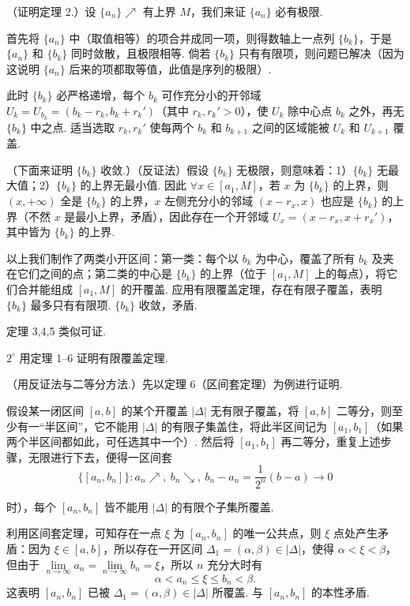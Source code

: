 \documentclass[UTF8,12pt,a4paper,fontset=fandol]{ctexart}
\begin{document}
（证明定理 2.）设 $\{a_n\}\nearrow$ 有上界 $M$，我们来证 $\{a_n\}$ 必有极限.

首先将 $\{a_n\}$ 中（取值相等）的项合并成同一项，则得数轴上一点列 $\{b_k\}$，于是 $\{a_n\}$ 和 $\{b_k\}$ 同时敛散，且极限相等. 倘若 $\{b_k\}$ 只有有限项，则问题已解决（因为这说明 $\{a_n\}$ 后来的项都取等值，此值是序列的极限）.

此时 $\{b_k\}$ 必严格递增，每个 $b_k$ 可作充分小的开邻域 $U_k=U_{b_k}=(b_k-r_k,b_k+r_k')$（其中 $r_k,r_k'>0$），使 $U_k$ 除中心点 $b_k$ 之外，再无 $\{b_k\}$ 中之点. 适当选取 $r_k,r_k'$ 使每两个 $b_k$ 和 $b_{k+1}$ 之间的区域能被 $U_k$ 和 $U_{k+1}$ 覆盖.

（下面来证明 $\{b_k\}$ 收敛.）（反证法）假设 $\{b_k\}$ 无极限，则意味着：1）$\{b_k\}$ 无最大值；2）$\{b_k\}$ 的上界无最小值. 因此 $\forall x\in[a_1,M]$，若 $x$ 为 $\{b_k\}$ 的上界，则 $(x,+\infty)$ 全是 $\{b_k\}$ 的上界，$x$ 左侧充分小的邻域 $(x-r_x,x)$ 也应是 $\{b_k\}$ 的上界（不然 $x$ 是最小上界，矛盾），因此存在一个开邻域 $U_x=(x-r_x,x+r_x')$，其中皆为 $\{b_k\}$ 的上界.

以上我们制作了两类小开区间：第一类：每个以 $b_k$ 为中心，覆盖了所有 $b_k$ 及夹在它们之间的点；第二类的中心是 $\{b_k\}$ 的上界（位于 $[a_1,M]$ 上的每点），将它们合并能组成 $[a_1,M]$ 的开覆盖. 应用有限覆盖定理，存在有限子覆盖，表明 $\{b_k\}$ 最多只有有限项. $\{b_k\}$ 收敛，矛盾.

定理 3,4,5 类似可证.

$2^\circ$ 用定理 1--6 证明有限覆盖定理.

（用反证法与二等分方法.）先以定理 6（区间套定理）为例进行证明.

假设某一闭区间 $[a,b]$ 的某个开覆盖 $|\Delta|$ 无有限子覆盖，将 $[a,b]$ 二等分，则至少有一“半区间”，它不能用 $|\Delta|$ 的有限子集盖住，将此半区间记为 $[a_1,b_1]$（如果两个半区间都如此，可任选其中一个）. 然后将 $[a_1,b_1]$ 再二等分，重复上述步骤，无限进行下去，便得一区间套
\[
  \{[a_n,b_n]\}: a_n\nearrow,\ b_n\searrow,\ b_n-a_n=\frac1{2^n}(b-a)\to0
\]

时），每个 $[a_n,b_n]$ 皆不能用 $|\Delta|$ 的有限个子集所覆盖.

利用区间套定理，可知存在一点 $\xi$ 为 $[a_n,b_n]$ 的唯一公共点，则 $\xi$ 点处产生矛盾：因为 $\xi\in[a,b]$，所以存在一开区间 $\Delta_1=(\alpha,\beta)\in|\Delta|$，使得 $\alpha<\xi<\beta$，但由于 $\lim\limits_{n\to\infty}a_n=\lim\limits_{n\to\infty}b_n=\xi$，所以 $n$ 充分大时有
\[
  \alpha<a_n\le \xi\le b_n<\beta.
\]
这表明 $[a_n,b_n]$ 已被 $\Delta_1=(\alpha,\beta)\in|\Delta|$ 所覆盖. 与 $[a_n,b_n]$ 的本性矛盾.
\end{document}
